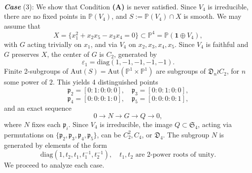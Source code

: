 \documentclass[12pt,reqno]{amsart}
\theoremstyle{plain}
\theoremstyle{remark}
\theoremstyle{definition}
\numberwithin{equation}{section}
\def\fD{{\mathfrak D}}
\def\fS{{\mathfrak S}}
\def\fS{{\mathfrak S}}
\def\bP{{\mathbb P}}
\def\Aut{\mathrm{Aut}}
\begin{document}
\

{\bf\em Case} (3): We show that Condition {\bf (A)} is never satisfied. Since $V_4$ is irreducible, 
there are no fixed points in $\bP(V_4)$, and $S:=\bP(V_4)\cap X$ is smooth. 
We may assume that 
    $$
    X=\{x_1^2+x_2x_5-x_3x_4=0\}\subset\bP^4=\bP(\mathbf 1\oplus V_4),
    $$
    with $G$ acting trivially on $x_1$, and via $V_4$ on $x_2,x_3,x_4,x_5$. Since $V_4$ is faithful and $G$ preserves $X$, the center of $G$ is $C_2$, generated by
    $$
\varepsilon_1=\mathrm{diag}(1,-1,-1,-1,-1).  
    $$
   Finite 2-subgroups of $\Aut(S)=\Aut(\bP^1\times\bP^1)$ are subgroups of $\fD_n\wr C_2$,  for $n$ some power of $2$. This yields 4 distinguished points  
$$
\mathfrak p_2=[0:1:0:0:0],\quad \mathfrak p_3=[0:0:1:0:0],
$$
$$
\mathfrak p_4=[0:0:0:1:0],\quad \mathfrak p_5=[0:0:0:0:1],
$$   
and an exact sequence 
$$
0\to N\to G\to Q\to 0,
$$
where $N$ fixes each $\mathfrak p_i$. Since $V_4$ is irreducible, 
the image $Q\subset \fS_4$, acting via permutations on $\{\mathfrak p_2,\mathfrak p_3,\mathfrak p_4,\mathfrak p_5\}$, can be $C_2^2, C_4$, or $\fD_4$. 
The subgroup $N$ is generated by elements of the form 
$$
\mathrm{diag}(1,t_2,t_1,t_1^{-1},t_2^{-1}), \quad t_1,t_2\text{ are }2\text{-power roots of unity.}
$$
We proceed to analyze each case. 

\ 
\end{document}
